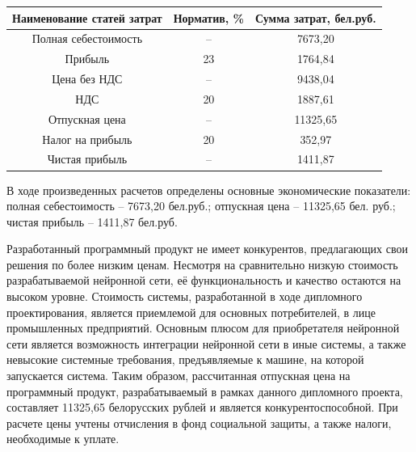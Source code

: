 {{\begin{Center}
        \renewcommand{\arraystretch}{1.4} %
        \begin{tabular}{|c|c|c|}
        \hline
        Наименование статей затрат & Норматив, \% & Сумма затрат, бел.руб. \\ \hline
        Полная себестоимость & {--} & 7673,20 \\ \hline
        Прибыль & 23 & 1764,84 \\ \hline
        Цена без НДС & {--} & 9438,04 \\ \hline
        НДС & 20 & 1887,61 \\ \hline
        Отпускная цена & {--} & 11325,65 \\ \hline
        Налог на прибыль & 20 & 352,97 \\ \hline
        Чистая прибыль & {--} & 1411,87 \\ \hline
        \end{tabular}
    \end{Center}}
    \botTablespace \addtocounter{tablecntr}{1}

    \par \redline В ходе произведенных расчетов определены основные экономические показатели: полная себестоимость {--} 7673,20 бел.руб.; отпускная цена {--} 11325,65 бел. руб.; чистая прибыль {--} 1411,87 бел.руб. 

    \par \redline Разработанный программный продукт не имеет конкурентов, предлагающих свои решения по более низким ценам. Несмотря на сравнительно низкую стоимость разрабатываемой нейронной сети, её функциональность и качество остаются на высоком уровне. Стоимость системы, разработанной в ходе дипломного проектирования, является приемлемой для основных потребителей, в лице промышленных предприятий. Основным плюсом для приобретателя нейронной сети является возможность интеграции нейронной сети в иные системы, а также невысокие системные требования, предъявляемые к машине, на которой запускается система. Таким образом, рассчитанная отпускная цена на программный продукт, разрабатываемый в рамках данного дипломного проекта, составляет 11325,65 белорусских рублей и является конкурентоспособной. При расчете цены учтены отчисления в фонд социальной защиты, а также налоги, необходимые к уплате.

}

\setcounter{subchaptercntr}{1}
\setcounter{formulacntr}{1}
\setcounter{imagecntr}{1}